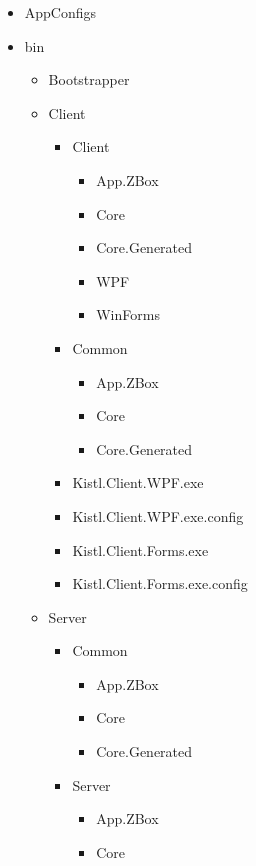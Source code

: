   	\begin{itemize}
  	  \item AppConfigs
  	  \item { bin
  	  	\begin{itemize}
  	  	  \item Bootstrapper
  	  	  \item { Client
  	  	  	\begin{itemize}
  	  	  	  \item { Client
  	  	  	  	\begin{itemize}
  	  	  	  	  \item App.ZBox
  	  	  	  	  \item Core
  	  	  	  	  \item Core.Generated
  	  	  	  	  \item WPF
  	  	  	  	  \item WinForms
  	  	  	  	 \end{itemize}
  	  	  	  }
  	  	  	  \item { Common
  	  	  	  	\begin{itemize}
  	  	  	  	  \item App.ZBox
  	  	  	  	  \item Core
  	  	  	  	  \item Core.Generated
  	  	  	  	 \end{itemize}
  	  	  	  }
  	  	  	  \item Kistl.Client.WPF.exe
  	  	  	  \item Kistl.Client.WPF.exe.config
  	  	  	  \item Kistl.Client.Forms.exe
  	  	  	  \item Kistl.Client.Forms.exe.config
  	  	  	\end{itemize}  
  	  	  }
  	  	  \item {Server
  	  	  	\begin{itemize}
  	  	  	  \item { Common
  	  	  	  	\begin{itemize}
  	  	  	  	  \item App.ZBox
  	  	  	  	  \item Core
  	  	  	  	  \item Core.Generated
  	  	  	  	 \end{itemize}
  	  	  	  }
  	  	  	  \item { Server
  	  	  	  	\begin{itemize}
  	  	  	  	  \item App.ZBox
  	  	  	  	  \item Core

\end{itemize}}
\end{itemize}}
\end{itemize}}
\end{itemize}
